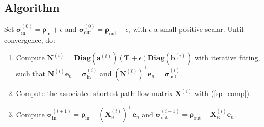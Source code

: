 \documentclass[11p]{article}
\begin{document}
\subsection{Algorithm}
Set $\bm{\sigma}^{(0)}_\text{in} = \bm{\rho}_\text{in} + \epsilon$ and $\bm{\sigma}^{(0)}_\text{out} = \bm{\rho}_\text{out} + \epsilon$, with $\epsilon$ a small positive scalar. Until convergence, do:
\begin{enumerate}
	\item Compute $\mathbf{N}^{(i)} = \textbf{Diag}(\mathbf{a}^{(i)}) (\mathbf{T} + \epsilon)\textbf{Diag}(\mathbf{b}^{(i)})$ with iterative fitting, such that $\mathbf{N}^{(i)} \mathbf{e}_n = \bm{\sigma}^{(i)}_\text{in}$ and $\left(\mathbf{N}^{(i)}\right)^\top \mathbf{e}_n = \bm{\sigma}^{(i)}_\text{out}$.
	\item Compute the associated shortest-path flow matrix $\mathbf{X}^{(i)}$ with (\ref{sp_comp}).
	\item Compute $\bm{\sigma}^{(i+1)}_\text{in} = \bm{\rho}_\text{in} -  (\mathbf{X}^{(i)}_\text{B})^\top \mathbf{e}_n$ and $\bm{\sigma}^{(i+1)}_\text{out} = \bm{\rho}_\text{out} - \mathbf{X}^{(i)}_\text{B} \mathbf{e}_n$. 
\end{enumerate}
\end{document}

